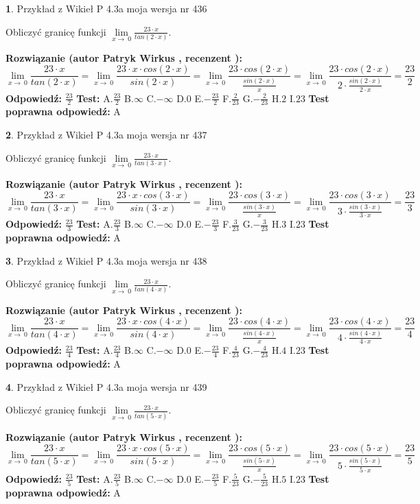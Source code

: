\documentclass[12pt, a4paper]{article}
\theoremstyle{definition} %
\newtheorem{zad}{}
\newcommand{\zadStart}[1]{\begin{zad}#1\newline}
\newcommand{\zadStop}{\end{zad}}
\newcommand{\rozwStart}[2]{\noindent \textbf{Rozwiązanie (autor #1 , recenzent #2): }\newline}
\newcommand{\rozwStop}{\newline}
\newcommand{\odpStart}{\noindent \textbf{Odpowiedź:}\newline}
\newcommand{\odpStop}{\newline}
\newcommand{\testStart}{\noindent \textbf{Test:}\newline}
\newcommand{\testStop}{\newline}
\newcommand{\kluczStart}{\noindent \textbf{Test poprawna odpowiedź:}\newline}
\newcommand{\kluczStop}{\newline}
\begin{document}
\zadStart{Przykład z Wikieł P 4.3a moja wersja nr 436}


Obliczyć granicę funkcji $\lim\limits_{x\to\ 0}\frac{23 \cdot x}{tan(2 \cdot x)}$.
\zadStop
\rozwStart{Patryk Wirkus}{}
$$\lim\limits_{x\to\ 0}\frac{23 \cdot x}{tan(2 \cdot x)}=\lim\limits_{x\to\ 0}\frac{23 \cdot x \cdot cos(2 \cdot x)}{sin(2 \cdot x)}=\lim\limits_{x\to\ 0}\frac{23 \cdot cos(2 \cdot x)}{\frac{sin(2 \cdot x)}{x}}=\lim\limits_{x\to\ 0}\frac{23 \cdot cos(2 \cdot x)}{2 \cdot \frac{sin(2 \cdot x)}{2 \cdot x}} = \frac{23}{2}$$
\rozwStop
\odpStart
$\frac{23}{2}$
\odpStop
\testStart
A.$\frac{23}{2}$
B.$\infty$
C.$-\infty$
D.$0$
E.$-\frac{23}{2}$
F.$\frac{2}{23}$
G.$-\frac{2}{23}$
H.$2$
I.$23$
\testStop
\kluczStart
A
\kluczStop



\zadStart{Przykład z Wikieł P 4.3a moja wersja nr 437}


Obliczyć granicę funkcji $\lim\limits_{x\to\ 0}\frac{23 \cdot x}{tan(3 \cdot x)}$.
\zadStop
\rozwStart{Patryk Wirkus}{}
$$\lim\limits_{x\to\ 0}\frac{23 \cdot x}{tan(3 \cdot x)}=\lim\limits_{x\to\ 0}\frac{23 \cdot x \cdot cos(3 \cdot x)}{sin(3 \cdot x)}=\lim\limits_{x\to\ 0}\frac{23 \cdot cos(3 \cdot x)}{\frac{sin(3 \cdot x)}{x}}=\lim\limits_{x\to\ 0}\frac{23 \cdot cos(3 \cdot x)}{3 \cdot \frac{sin(3 \cdot x)}{3 \cdot x}} = \frac{23}{3}$$
\rozwStop
\odpStart
$\frac{23}{3}$
\odpStop
\testStart
A.$\frac{23}{3}$
B.$\infty$
C.$-\infty$
D.$0$
E.$-\frac{23}{3}$
F.$\frac{3}{23}$
G.$-\frac{3}{23}$
H.$3$
I.$23$
\testStop
\kluczStart
A
\kluczStop



\zadStart{Przykład z Wikieł P 4.3a moja wersja nr 438}


Obliczyć granicę funkcji $\lim\limits_{x\to\ 0}\frac{23 \cdot x}{tan(4 \cdot x)}$.
\zadStop
\rozwStart{Patryk Wirkus}{}
$$\lim\limits_{x\to\ 0}\frac{23 \cdot x}{tan(4 \cdot x)}=\lim\limits_{x\to\ 0}\frac{23 \cdot x \cdot cos(4 \cdot x)}{sin(4 \cdot x)}=\lim\limits_{x\to\ 0}\frac{23 \cdot cos(4 \cdot x)}{\frac{sin(4 \cdot x)}{x}}=\lim\limits_{x\to\ 0}\frac{23 \cdot cos(4 \cdot x)}{4 \cdot \frac{sin(4 \cdot x)}{4 \cdot x}} = \frac{23}{4}$$
\rozwStop
\odpStart
$\frac{23}{4}$
\odpStop
\testStart
A.$\frac{23}{4}$
B.$\infty$
C.$-\infty$
D.$0$
E.$-\frac{23}{4}$
F.$\frac{4}{23}$
G.$-\frac{4}{23}$
H.$4$
I.$23$
\testStop
\kluczStart
A
\kluczStop



\zadStart{Przykład z Wikieł P 4.3a moja wersja nr 439}


Obliczyć granicę funkcji $\lim\limits_{x\to\ 0}\frac{23 \cdot x}{tan(5 \cdot x)}$.
\zadStop
\rozwStart{Patryk Wirkus}{}
$$\lim\limits_{x\to\ 0}\frac{23 \cdot x}{tan(5 \cdot x)}=\lim\limits_{x\to\ 0}\frac{23 \cdot x \cdot cos(5 \cdot x)}{sin(5 \cdot x)}=\lim\limits_{x\to\ 0}\frac{23 \cdot cos(5 \cdot x)}{\frac{sin(5 \cdot x)}{x}}=\lim\limits_{x\to\ 0}\frac{23 \cdot cos(5 \cdot x)}{5 \cdot \frac{sin(5 \cdot x)}{5 \cdot x}} = \frac{23}{5}$$
\rozwStop
\odpStart
$\frac{23}{5}$
\odpStop
\testStart
A.$\frac{23}{5}$
B.$\infty$
C.$-\infty$
D.$0$
E.$-\frac{23}{5}$
F.$\frac{5}{23}$
G.$-\frac{5}{23}$
H.$5$
I.$23$
\testStop
\kluczStart
A
\kluczStop
\end{document}
